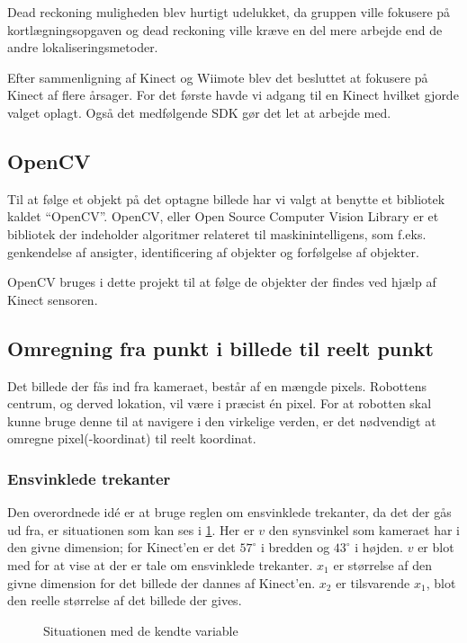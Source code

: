 Dead reckoning muligheden blev hurtigt udelukket, da gruppen ville fokusere på kortlægningsopgaven og dead reckoning ville kræve en del mere arbejde end de andre lokaliseringsmetoder.

Efter sammenligning af Kinect og Wiimote blev det besluttet at fokusere på Kinect af flere årsager.
For det første havde vi adgang til en Kinect hvilket gjorde valget oplagt. 
Også det medfølgende SDK gør det let at arbejde med.

\subsection{OpenCV}
Til at følge et objekt på det optagne billede har vi valgt at benytte et bibliotek kaldet ``OpenCV''.
OpenCV, eller Open Source Computer Vision Library er et bibliotek der indeholder algoritmer relateret til maskinintelligens, som f.eks. genkendelse af ansigter, identificering af objekter og forfølgelse af objekter.\cite{opencv}

OpenCV bruges i dette projekt til at følge de objekter der findes ved hjælp af Kinect sensoren.

\clearpage
\subsection{Omregning fra punkt i billede til reelt punkt}
Det billede der fås ind fra kameraet, består af en mængde pixels.
Robottens centrum, og derved lokation, vil være i præcist én pixel.
For at robotten skal kunne bruge denne til at navigere i den virkelige verden, er det nødvendigt at omregne pixel(-koordinat) til reelt koordinat.

\subsubsection{Ensvinklede trekanter}
Den overordnede idé er at bruge reglen om ensvinklede trekanter, da det der gås ud fra, er situationen som kan ses i \cref{fig:kameratrekant}.
Her er $v$ den synsvinkel som kameraet har i den givne dimension; for Kinect'en er det $57^\circ$ i bredden og $43^\circ$ i højden.
$v$ er blot med for at vise at der er tale om ensvinklede trekanter.
$x_1$ er størrelse af den givne dimension for det billede der dannes af Kinect'en.
$x_2$ er tilsvarende $x_1$, blot den reelle størrelse af det billede der gives.

\begin{figure}[h]
\centering
{}
\caption{Situationen med de kendte variable}
\label{fig:kameratrekant}
\end{figure}

